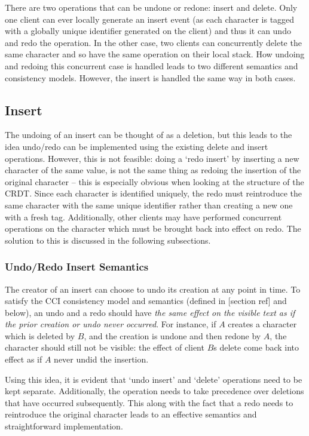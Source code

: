 \documentclass[12pt,a4paper,twoside,openright]{report}
\begin{document}
	There are two operations that can be undone or redone: insert and delete. Only one client can ever locally generate an insert event (as each character is tagged with a globally unique identifier generated on the client) and thus it can undo and redo the operation. In the other case, two clients can concurrently delete the same character and so have the same operation on their local stack. How undoing and redoing this concurrent case is handled leads to two different semantics and consistency models. However, the insert is handled the same way in both cases.
	
	
	\subsection{Insert}
	The undoing of an insert can be thought of as a deletion, but this leads to the idea undo/redo can be implemented using the existing delete and insert operations. However, this is not feasible: doing a `redo insert' by inserting a new character of the same value, is not the same thing as redoing the insertion of the original character -- this is especially obvious when looking at the structure of the CRDT. Since each character is identified uniquely, the redo must reintroduce the same character with the same unique identifier rather than creating a new one with a fresh tag. Additionally, other clients may have performed concurrent operations on the character which must be brought back into effect on redo. The solution to this is discussed in the following subsections.
	
		\subsubsection{Undo/Redo Insert Semantics}
		The creator of an insert can choose to undo its creation at any point in time. To satisfy the CCI consistency model and semantics (defined in [section ref] and below), an undo and a redo should have \textit{the same effect on the visible text as if the prior creation or undo never occurred}. For instance, if $A$ creates a character which is deleted by $B$, and the creation is undone and then redone by $A$, the character should still not be visible: the effect of client $B$s delete come back into effect as if $A$ never undid the insertion.
		
		Using this idea, it is evident that `undo insert' and `delete' operations need to be kept separate. Additionally, the operation needs to take precedence over deletions that have occurred subsequently. This along with the fact that a redo needs to reintroduce the original character leads to an effective semantics and straightforward implementation.
		
\end{document}

